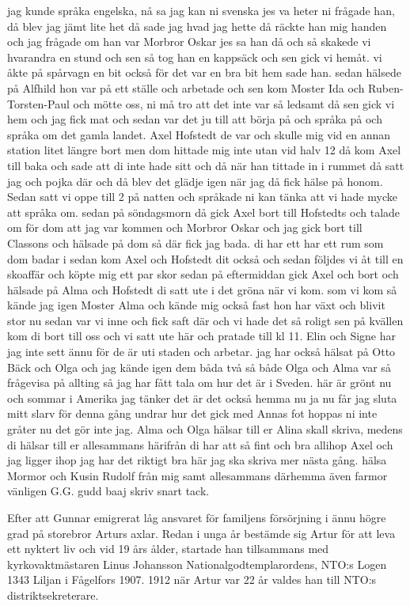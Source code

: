 jag kunde språka engelska, nå sa jag kan ni svenska jes va heter ni frågade han, då blev jag jämt lite het då sade jag hvad jag hette då räckte han mig handen och jag frågade om han var Morbror Oskar jes sa han då och så skakede vi hvarandra en stund och sen så tog han en kappsäck och sen gick vi hemåt. vi åkte på spårvagn en bit också för det var en bra bit hem sade han. sedan hälsede på Alfhild hon var på ett ställe och arbetade och sen kom Moster Ida och Ruben-Torsten-Paul och mötte oss, ni må tro att det inte var så ledsamt då sen gick vi hem och jag fick mat och sedan var det ju till att börja på och språka på och språka om det gamla landet. Axel Hofstedt de var och skulle mig vid en annan station litet längre bort men dom hittade mig inte utan vid halv 12 då kom Axel till baka och sade att di inte hade sitt och då när han tittade in i rummet då satt jag och pojka där och då blev det glädje igen när jag då fick hälse på honom. Sedan satt vi oppe till 2 på natten och språkade ni kan tänka att vi hade mycke att språka om. sedan på söndagsmorn då gick Axel bort till Hofstedts och talade om för dom att jag var kommen och Morbror Oskar och jag gick bort till Classons och hälsade på dom så där fick jag bada. di har ett har ett rum som dom badar i sedan kom Axel och Hofstedt dit också och sedan följdes vi åt till en skoaffär och köpte mig ett par skor sedan på eftermiddan gick Axel och bort och hälsade på Alma och Hofstedt di satt ute i det gröna när vi kom. som vi kom så kände jag igen Moster Alma och kände mig också fast hon har växt och blivit stor nu sedan var vi inne och fick saft där och vi hade det så roligt sen på kvällen kom di bort till oss och vi satt ute här och pratade till kl 11. Elin och Signe har jag inte sett ännu för de är uti staden och arbetar. jag har också hälsat på Otto Bäck och Olga och jag kände igen dem båda två så både Olga och Alma var så frågevisa på allting så jag har fått tala om hur det är i Sveden. här är grönt nu och sommar i Amerika jag tänker det är det också hemma nu ja nu får jag sluta mitt slarv för denna gång undrar hur det gick med Annas fot hoppas ni inte gråter nu det gör inte jag. Alma och Olga hälsar till er Alina skall skriva, medens di hälsar till er allesammans härifrån di har att så fint och bra allihop Axel och jag ligger ihop jag har det riktigt bra här jag ska skriva mer nästa gång. hälsa Mormor och Kusin Rudolf från mig samt allesammans därhemma även farmor vänligen G.G. gudd baaj skriv snart tack.
\stopblockquote

Efter att Gunnar emigrerat låg ansvaret för familjens försörjning i ännu högre grad på storebror Arturs axlar. Redan i unga år bestämde sig Artur för att leva ett nyktert liv och vid 19 års ålder, startade han tillsammans med kyrkovaktmästaren Linus Johansson Nationalgodtemplarordens, NTO:s Logen 1343 Liljan i Fågelfors 1907.
1912 när Artur var 22 år valdes han till NTO:s distriktsekreterare. 

